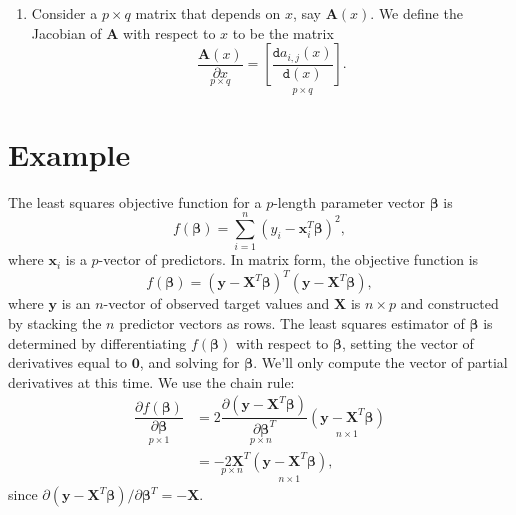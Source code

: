 \documentclass[graybox,envcountchap]{svmono}
\newcommand{\Xf}{\mathbf{X}}
\newcommand{\xf}{\mathbf{x}}
\newcommand{\yf}{\mathbf{y}}
\newcommand{\bef}{\boldsymbol{\beta}}
\newcommand{\tx}{\texttt}
\begin{document}
\begin{enumerate}
\item Consider a $p \times q$ matrix that depends on $x$, say $\mathbf{A}(x)$. We define the Jacobian of $\mathbf{A}$ with respect to $x$ to be the matrix 
\begin{equation}
 \underset{p \times q}{\dfrac{\mathbf{A}(x) }{ \partial x}} = \underset{p \times q}{\left[ \frac{\tx{d} a_{i,j}(x)}{\tx{d}(x)}\right]}.
\end{equation}
\end{enumerate}

\section{Example}
The least squares objective function for a $p$-length parameter vector $\bef$ is 
\begin{equation}
 f(\bef) = \sum_{i=1}^n (y_i - \xf_i^T\bef)^2 ,
\end{equation}
where $\xf_i$ is a $p$-vector of predictors. In matrix form, the objective function is 
\begin{equation}
 f(\bef) =  (\yf - \Xf^T\bef)^T(\yf - \Xf^T\bef) ,
\end{equation}
where $\yf$ is an $n$-vector of observed target values and $ \Xf$ is $n \times p$ and constructed by stacking the $n$ predictor vectors as rows. The least squares estimator of $\bef$ is determined by differentiating $f(\bef)$ with respect to $\bef$, setting the vector of derivatives equal to $\mathbf{0}$, and solving for $\bef$.  We'll only compute the vector of partial derivatives at this time. We use the chain rule:
\begin{equation}\label{eq:lsEstr}
\begin{align}
 \underset{p \times 1}{\dfrac{\partial f(\bef)}{\partial \bef}} &=  \underset{p \times n}{2\dfrac{\partial(\yf - \Xf^T\bef)}{\partial \bef^T} } \underset{n \times 1}{(\yf - \Xf^T\bef)}\\
 & =\underset{p \times n}{-2 \Xf^T}\underset{n \times 1}{(\yf - \Xf^T\bef)},
\end{align}
\end{equation}
since ${\partial(\yf - \Xf^T\bef)}/{\partial \bef^T} = - \Xf$.
\end{document}
